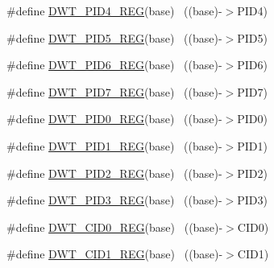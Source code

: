 \begin{DoxyCompactItemize}
\item 
\#define \hyperlink{group___d_w_t___register___accessor___macros_gafdad2b8a5caa1715b1d7fbe6850c324d}{D\+W\+T\+\_\+\+P\+I\+D4\+\_\+\+R\+EG}(base)                                          ~((base)-\/$>$P\+I\+D4)
\item 
\#define \hyperlink{group___d_w_t___register___accessor___macros_gad638e97562bc8fa280d32b7869c712d1}{D\+W\+T\+\_\+\+P\+I\+D5\+\_\+\+R\+EG}(base)                                          ~((base)-\/$>$P\+I\+D5)
\item 
\#define \hyperlink{group___d_w_t___register___accessor___macros_gaa7f5da9ec68998f6952de46154855328}{D\+W\+T\+\_\+\+P\+I\+D6\+\_\+\+R\+EG}(base)                                          ~((base)-\/$>$P\+I\+D6)
\item 
\#define \hyperlink{group___d_w_t___register___accessor___macros_ga5dac20d58b3ff153ca8aa07e73990545}{D\+W\+T\+\_\+\+P\+I\+D7\+\_\+\+R\+EG}(base)                                          ~((base)-\/$>$P\+I\+D7)
\item 
\#define \hyperlink{group___d_w_t___register___accessor___macros_ga0f86233b0c83a9d6f4f1045787a2d2e1}{D\+W\+T\+\_\+\+P\+I\+D0\+\_\+\+R\+EG}(base)                                          ~((base)-\/$>$P\+I\+D0)
\item 
\#define \hyperlink{group___d_w_t___register___accessor___macros_ga3402a8a818794eaf102e1d7bfcaf3167}{D\+W\+T\+\_\+\+P\+I\+D1\+\_\+\+R\+EG}(base)                                          ~((base)-\/$>$P\+I\+D1)
\item 
\#define \hyperlink{group___d_w_t___register___accessor___macros_ga9e1b1b5093546468be7371b773b051bd}{D\+W\+T\+\_\+\+P\+I\+D2\+\_\+\+R\+EG}(base)                                          ~((base)-\/$>$P\+I\+D2)
\item 
\#define \hyperlink{group___d_w_t___register___accessor___macros_ga0cbc2af1666ca376f4593b2ee568ea1a}{D\+W\+T\+\_\+\+P\+I\+D3\+\_\+\+R\+EG}(base)                                          ~((base)-\/$>$P\+I\+D3)
\item 
\#define \hyperlink{group___d_w_t___register___accessor___macros_gab77163d0264bc009ac5622e766e24a93}{D\+W\+T\+\_\+\+C\+I\+D0\+\_\+\+R\+EG}(base)                                          ~((base)-\/$>$C\+I\+D0)
\item 
\#define \hyperlink{group___d_w_t___register___accessor___macros_ga029e546d2d8949b27c55a4785da019eb}{D\+W\+T\+\_\+\+C\+I\+D1\+\_\+\+R\+EG}(base)                                          ~((base)-\/$>$C\+I\+D1)
\item 

\end{DoxyCompactItemize}
